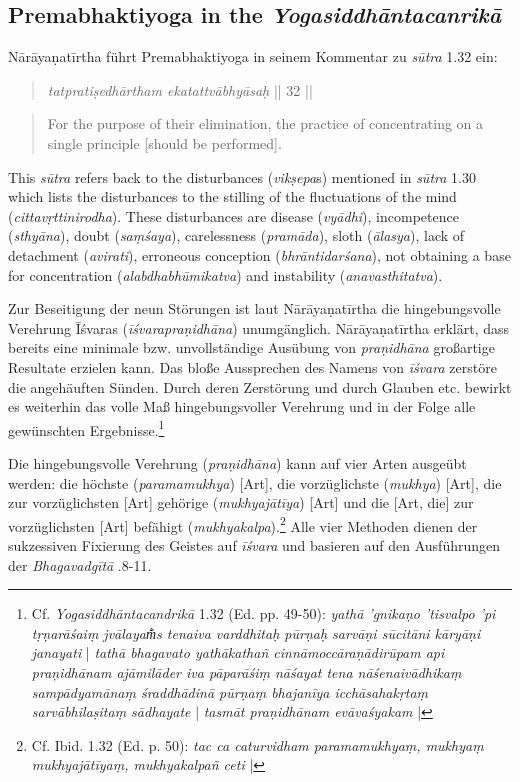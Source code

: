 \subsection{Premabhaktiyoga in the \emph{Yogasiddhāntacanrikā}}
\label{premabhaktiyoga}

Nārāyaṇatīrtha führt Premabhaktiyoga in seinem Kommentar zu \textit{sūtra} 1.32 ein:
\begin{quote}
  \textit{tatpratiṣedhārtham ekatattvābhyāsaḥ} || 32 ||
\end{quote}
\begin{quote}
For the purpose of their elimination, the practice of concentrating on a single principle [should be performed].
\end{quote}

This \textit{sūtra} refers back to the disturbances (\textit{vikṣepa}s) mentioned in \textit{sūtra} 1.30 which lists the disturbances to the stilling of the fluctuations of the mind (\textit{cittavṛttinirodha}). These disturbances are disease (\textit{vyādhi}), incompetence (\textit{sthyāna}), doubt (\textit{saṃśaya}), carelessness (\textit{pramāda}), sloth (\textit{ālasya}), lack of detachment (\textit{avirati}), erroneous conception (\textit{bhrāntidarśana}), not obtaining a base for concentration (\textit{alabdhabhūmikatva}) and instability (\textit{anavasthitatva}).

Zur Beseitigung der neun Störungen ist laut Nārāyaṇatīrtha die hingebungsvolle Verehrung Īśvaras (\textit{īśvarapraṇidhāna}) unumgänglich. Nārāyaṇatīrtha erklärt, dass bereits eine minimale bzw. unvollständige Ausübung von \textit{praṇidhāna} großartige Resultate erzielen kann. Das bloße Aussprechen des Namens von \textit{īśvara} zerstöre die angehäuften Sünden. Durch deren Zerstörung und durch Glauben etc. bewirkt es weiterhin das volle Maß hingebungsvoller Verehrung und in der Folge alle gewünschten Ergebnisse.\footnote{Cf. \textit{Yogasiddhāntacandrikā} 1.32 (Ed. pp. 49-50): \textit{yathā 'gnikaṇo 'tisvalpo 'pi tṛṇarāśaiṃ jvālayam̐s tenaiva varddhitaḥ pūrṇaḥ sarvāṇi sūcitāni kāryāṇi janayati} | \textit{tathā bhagavato yathākathañ cinnāmoccāraṇādirūpam api praṇidhānam ajāmilāder iva pāparāśiṃ nāśayat tena nāśenaivādhikaṃ sampādyamānaṃ śraddhādinā pūrṇaṃ bhajanīya icchāsahakṛtaṃ sarvābhilaṣitaṃ sādhayate} | \textit{tasmāt praṇidhānam evāvaśyakam} |}

Die hingebungsvolle Verehrung (\textit{praṇidhāna}) kann auf vier Arten ausgeübt werden: die höchste (\textit{paramamukhya}) [Art], die vorzüglichste (\textit{mukhya}) [Art], die zur vorzüglichsten [Art] gehörige (\textit{mukhyajātīya}) [Art] und die [Art, die] zur vorzüglichsten [Art] befähigt (\textit{mukhyakalpa}).\footnote{Cf. Ibid. 1.32 (Ed. p. 50): \textit{tac ca caturvidham paramamukhyaṃ, mukhyaṃ mukhyajātīyaṃ, mukhyakalpañ ceti} |} Alle vier Methoden dienen der sukzessiven Fixierung des Geistes auf \textit{īśvara} und basieren auf den Ausführungen der \textit{Bhagavadgītā} .8-11. 

